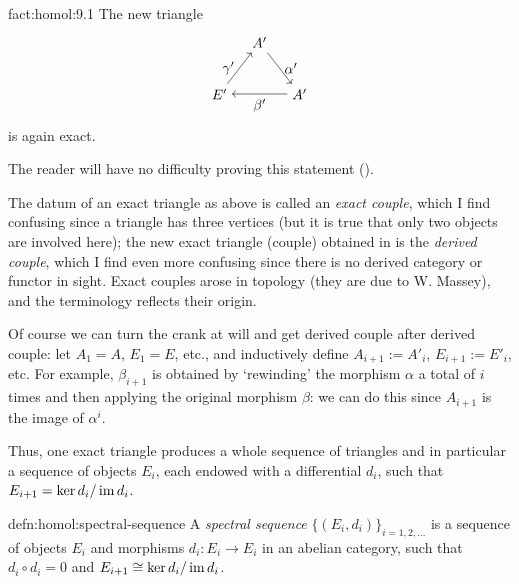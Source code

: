 \begin{fact}{}{fact:homol:9.1}
  The new triangle
  \[
    \begin{tikzpicture}[baseline=(current bounding box.center)]
      \node (A) at (1,1.3) {$A'$}; \node (E) at (0,0)
      {$E'$}; \node (A2) at (2,0)
      {$A'$}; \draw[->] (A) -- (A2) node[midway, right]
      {$\alpha'$}; \draw[->] (A2) -- (E) node[midway, below]
      {$\beta'$}; \draw[->] (E) -- (A) node[midway, left] {$\gamma'$};
    \end{tikzpicture}
  \]
  is again exact.
\end{fact}

The reader will have no difficulty proving this statement
().

The datum of an exact triangle as above is called an \emph{exact
  couple}, which I find confusing since a triangle has three vertices
(but it is true that only two objects are involved here); the new
exact triangle (couple) obtained in  is the
\emph{derived couple}, which I find even more confusing since there is
no derived category or functor in sight. Exact couples arose in
topology (they are due to W. Massey), and the terminology reflects
their origin.

Of course we can turn the crank at will and get derived couple after
derived couple: let $A_1 = A$, $E_1 = E$, etc., and inductively define
$A_{i+1} := A'_i$, $E_{i+1} := E'_i$, etc. For example, $\beta_{i+1}$
is obtained by `rewinding' the morphism $\alpha$ a total of $i$ times
and then applying the original morphism $\beta$: we can do this since
$A_{i+1}$ is the image of $\alpha^i$.

Thus, one exact triangle produces a whole sequence of triangles and in
particular a sequence of objects $E_i$, each endowed with a
differential $d_i$, such that $E_{i+1} = \ker d_i / \operatorname{im} d_i$.

\begin{defn}{}{defn:homol:spectral-sequence}
  A \emph{spectral sequence} $\{(E_i, d_i)\}_{i=1,2,\dots}$ is a
  sequence of objects $E_i$ and morphisms $d_i : E_i \to E_i$ in an
  abelian category, such that $d_i \circ d_i = 0$ and
  $E_{i+1} \cong \ker d_i / \operatorname{im} d_i$.
\end{defn}

